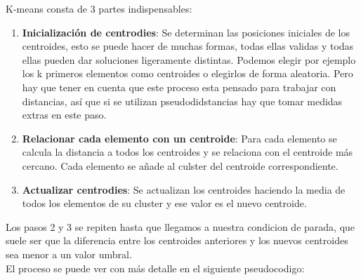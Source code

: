 \documentclass[12pt, letterpaper, twoside]{article}
\begin{document}
			K-means consta de 3 partes indispensables:
			\begin{enumerate}
			\item \textbf{Inicialización de centrodies}: Se determinan las posiciones iniciales de los centroides, esto se puede hacer de muchas formas, todas ellas validas y todas ellas pueden dar soluciones ligeramente distintas. Podemos elegir por ejemplo los k primeros elementos como centroides o elegirlos de forma aleatoria. Pero hay que tener en cuenta que este proceso esta pensado para trabajar con distancias, así que si se utilizan pseudodidstancias hay que tomar medidas extras en este paso.
			\item \textbf{Relacionar cada elemento con un centroide}: Para cada elemento se calcula la distancia a todos  los centroides y se relaciona con el centroide más cercano. Cada elemento se añade al culster del centroide correspondiente.
			\item \textbf{Actualizar centrodies}: Se actualizan los centroides haciendo la media de todos los elementos de su cluster y ese valor es el nuevo centroide.
			\end{enumerate}
			Los pasos 2 y 3 se repiten hasta que llegamos a nuestra condicion de parada, que suele ser que la diferencia entre los centroides anteriores y los nuevos centroides sea menor a un valor umbral.\\
			El proceso se puede ver con más detalle en el siguiente pseudocodigo:\\
\pagebreak
\end{document}
